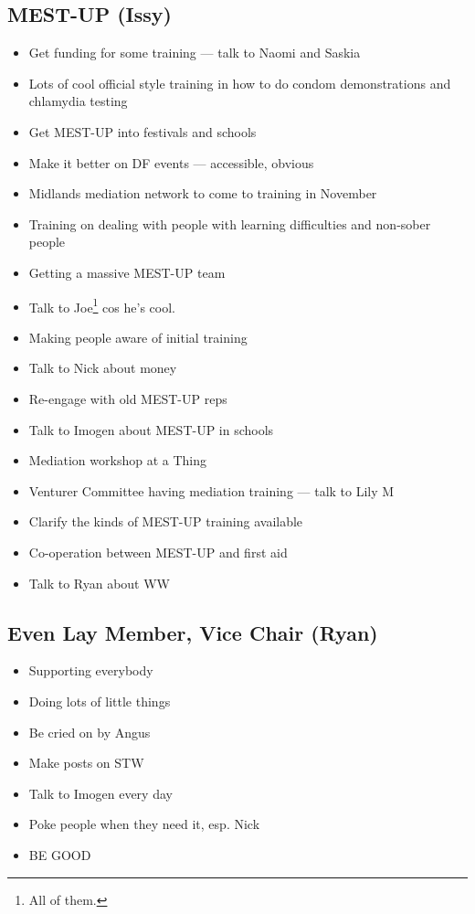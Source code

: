 \documentclass[a4paper, 11pt]{article} %
\begin{document}
\subsection{MEST-UP (Issy)}
\begin{itemize}
	\item Get funding for some training --- talk to Naomi and Saskia
	\item Lots of cool official style training in how to do condom demonstrations and chlamydia testing
	\item Get MEST-UP into festivals and schools
	\item Make it better on DF events --- accessible, obvious
	\item Midlands mediation network to come to training in November
	\item Training on dealing with people with learning difficulties and non-sober people
	\item Getting a massive MEST-UP team
	\item Talk to Joe\footnote{All of them.} cos he's cool.
	\item Making people aware of initial training
	\item Talk to Nick about money
	\item Re-engage with old MEST-UP reps
	\item Talk to Imogen about MEST-UP in schools
	\item Mediation workshop at a Thing
	\item Venturer Committee having mediation training --- talk to Lily M
	\item Clarify the kinds of MEST-UP training available
	\item Co-operation between MEST-UP and first aid
	\item Talk to Ryan about WW
\end{itemize}

\subsection{Even Lay Member, Vice Chair (Ryan)}
\begin{itemize}
	\item Supporting everybody
	\item Doing lots of little things
	\item Be cried on by Angus
	\item Make posts on STW
	\item Talk to Imogen every day
	\item Poke people when they need it, esp. Nick
	\item BE GOOD
\end{itemize}
\end{document}
